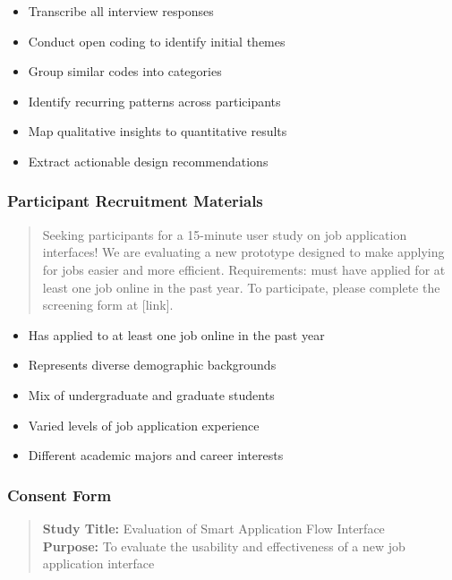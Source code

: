 \documentclass[
	letterpaper, %
]{jdf}
\begin{document}
\begin{sloppypar}
\begin{itemize}
    \item Transcribe all interview responses
    \item Conduct open coding to identify initial themes
    \item Group similar codes into categories
    \item Identify recurring patterns across participants
    \item Map qualitative insights to quantitative results
    \item Extract actionable design recommendations
\end{itemize}

\subsubsection*{Participant Recruitment Materials}

\begin{quote}
Seeking participants for a 15-minute user study on job application interfaces! We are evaluating a new prototype designed to make applying for jobs easier and more efficient. Requirements: must have applied for at least one job online in the past year. To participate, please complete the screening form at [link].
\end{quote}

\begin{itemize}
    \item Has applied to at least one job online in the past year
    \item Represents diverse demographic backgrounds
    \item Mix of undergraduate and graduate students
    \item Varied levels of job application experience
    \item Different academic majors and career interests
\end{itemize}

\subsubsection*{Consent Form}

\begin{quote}
\textbf{Study Title:} Evaluation of Smart Application Flow Interface\\
\textbf{Purpose:} To evaluate the usability and effectiveness of a new job application interface


\end{quote}
\end{sloppypar}
\end{document}
